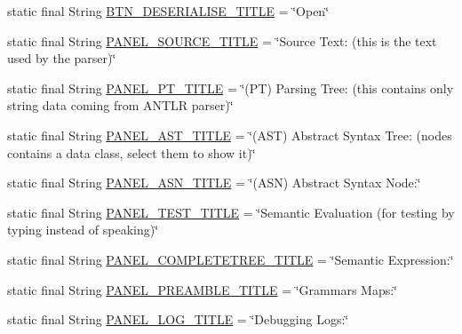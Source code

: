 \begin{DoxyCompactItemize}
\item 
static final String \hyperlink{classit_1_1emarolab_1_1cagg_1_1debugging_1_1DebuggingDefaults_aaa30a421f25d00b3bff77c6fdb247514}{B\-T\-N\-\_\-\-D\-E\-S\-E\-R\-I\-A\-L\-I\-S\-E\-\_\-\-T\-I\-T\-L\-E} = \char`\"{}Open\char`\"{}
\item 
static final String \hyperlink{classit_1_1emarolab_1_1cagg_1_1debugging_1_1DebuggingDefaults_a2cfae17841a8677e7bbdd0280676b4b9}{P\-A\-N\-E\-L\-\_\-\-S\-O\-U\-R\-C\-E\-\_\-\-T\-I\-T\-L\-E} = \char`\"{}Source Text\-: (this is the text used by the parser)\char`\"{}
\item 
static final String \hyperlink{classit_1_1emarolab_1_1cagg_1_1debugging_1_1DebuggingDefaults_a3fc27081a3f93504822aa3a32de9e14e}{P\-A\-N\-E\-L\-\_\-\-P\-T\-\_\-\-T\-I\-T\-L\-E} = \char`\"{}(P\-T) Parsing Tree\-: (this contains only string data coming from A\-N\-T\-L\-R parser)\char`\"{}
\item 
static final String \hyperlink{classit_1_1emarolab_1_1cagg_1_1debugging_1_1DebuggingDefaults_a404680a2bf11a877cf3056bf32060005}{P\-A\-N\-E\-L\-\_\-\-A\-S\-T\-\_\-\-T\-I\-T\-L\-E} = \char`\"{}(A\-S\-T) Abstract Syntax Tree\-: (nodes contains a data class, select them to show it)\char`\"{}
\item 
static final String \hyperlink{classit_1_1emarolab_1_1cagg_1_1debugging_1_1DebuggingDefaults_ad924bc8c8978a01904034f552874492b}{P\-A\-N\-E\-L\-\_\-\-A\-S\-N\-\_\-\-T\-I\-T\-L\-E} = \char`\"{}(A\-S\-N) Abstract Syntax Node\-:\char`\"{}
\item 
static final String \hyperlink{classit_1_1emarolab_1_1cagg_1_1debugging_1_1DebuggingDefaults_a91891320b8e913a9c5cce11995df1f28}{P\-A\-N\-E\-L\-\_\-\-T\-E\-S\-T\-\_\-\-T\-I\-T\-L\-E} = \char`\"{}Semantic Evaluation (for testing by typing instead of speaking)\char`\"{}
\item 
static final String \hyperlink{classit_1_1emarolab_1_1cagg_1_1debugging_1_1DebuggingDefaults_a621515d88b2f9bc0376ab79ac8060ba0}{P\-A\-N\-E\-L\-\_\-\-C\-O\-M\-P\-L\-E\-T\-E\-T\-R\-E\-E\-\_\-\-T\-I\-T\-L\-E} = \char`\"{}Semantic Expression\-:\char`\"{}
\item 
static final String \hyperlink{classit_1_1emarolab_1_1cagg_1_1debugging_1_1DebuggingDefaults_a91fc7a0d4cfd509d0d36de15fdfa3283}{P\-A\-N\-E\-L\-\_\-\-P\-R\-E\-A\-M\-B\-L\-E\-\_\-\-T\-I\-T\-L\-E} = \char`\"{}Grammars Maps\-:\char`\"{}
\item 
static final String \hyperlink{classit_1_1emarolab_1_1cagg_1_1debugging_1_1DebuggingDefaults_a0ee291f44dda35a1de8d5b01d8a06470}{P\-A\-N\-E\-L\-\_\-\-L\-O\-G\-\_\-\-T\-I\-T\-L\-E} = \char`\"{}Debugging Logs\-:\char`\"{}

\end{DoxyCompactItemize}
